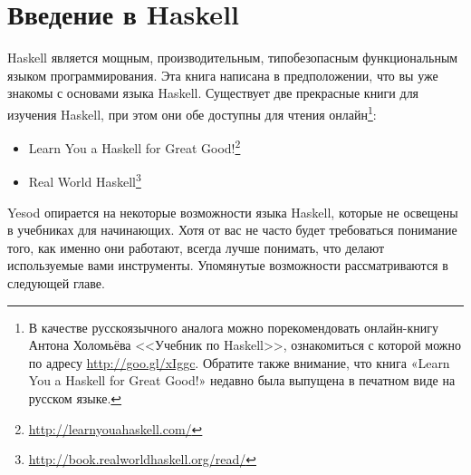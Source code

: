 \section{Введение в Haskell}

Haskell является мощным, производительным, типобезопасным функциональным языком программирования. Эта книга написана в предположении, что вы уже знакомы с основами языка Haskell. Существует две прекрасные книги для изучения Haskell, при этом они обе доступны для чтения онлайн\footnote{В качестве русскоязычного аналога можно порекомендовать онлайн-книгу Антона Холомьёва <<Учебник по Haskell>>, ознакомиться с которой можно по адресу \href{http://goo.gl/xIggc}{http://goo.gl/xIggc}. Обратите также внимание, что книга «Learn You a Haskell for Great Good!» недавно была выпущена в печатном виде на русском языке.}:

\begin{itemize}
  \item Learn You a Haskell for Great Good!\footnote{\href{http://learnyouahaskell.com/}{http://learnyouahaskell.com/}}
  \item Real World Haskell\footnote{\href{http://book.realworldhaskell.org/read/}{http://book.realworldhaskell.org/read/}}
\end{itemize}

Yesod опирается на некоторые возможности языка Haskell, которые не освещены в учебниках для начинающих. Хотя от вас не часто будет требоваться понимание того, как именно они работают, всегда лучше понимать, что делают используемые вами инструменты. Упомянутые возможности рассматриваются в следующей главе.


